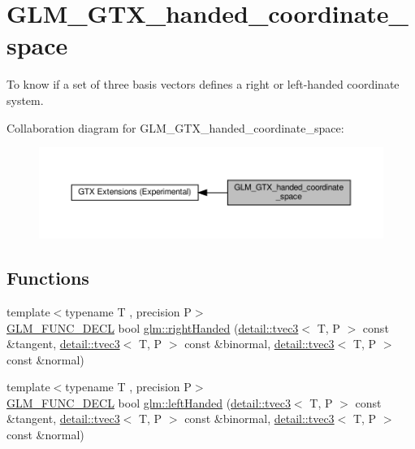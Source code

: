 \hypertarget{group__gtx__handed__coordinate__space}{}\section{G\+L\+M\+\_\+\+G\+T\+X\+\_\+handed\+\_\+coordinate\+\_\+space}
\label{group__gtx__handed__coordinate__space}


To know if a set of three basis vectors defines a right or left-\/handed coordinate system.  


Collaboration diagram for G\+L\+M\+\_\+\+G\+T\+X\+\_\+handed\+\_\+coordinate\+\_\+space\+:\nopagebreak
\begin{figure}[H]
\begin{center}
\leavevmode
\includegraphics[width=350pt]{group__gtx__handed__coordinate__space}
\end{center}
\end{figure}
\subsection*{Functions}
\begin{DoxyCompactItemize}
\item 
{\footnotesize template$<$typename T , precision P$>$ }\\\hyperlink{setup_8hpp_ab2d052de21a70539923e9bcbf6e83a51}{G\+L\+M\+\_\+\+F\+U\+N\+C\+\_\+\+D\+E\+CL} bool \hyperlink{group__gtx__handed__coordinate__space_ga16517e8a56cba5ba908e6eac6500ab94}{glm\+::right\+Handed} (\hyperlink{structglm_1_1detail_1_1tvec3}{detail\+::tvec3}$<$ T, P $>$ const \&tangent, \hyperlink{structglm_1_1detail_1_1tvec3}{detail\+::tvec3}$<$ T, P $>$ const \&binormal, \hyperlink{structglm_1_1detail_1_1tvec3}{detail\+::tvec3}$<$ T, P $>$ const \&normal)
\item 
{\footnotesize template$<$typename T , precision P$>$ }\\\hyperlink{setup_8hpp_ab2d052de21a70539923e9bcbf6e83a51}{G\+L\+M\+\_\+\+F\+U\+N\+C\+\_\+\+D\+E\+CL} bool \hyperlink{group__gtx__handed__coordinate__space_ga2c0882af0eabd0e39da5680931f586ed}{glm\+::left\+Handed} (\hyperlink{structglm_1_1detail_1_1tvec3}{detail\+::tvec3}$<$ T, P $>$ const \&tangent, \hyperlink{structglm_1_1detail_1_1tvec3}{detail\+::tvec3}$<$ T, P $>$ const \&binormal, \hyperlink{structglm_1_1detail_1_1tvec3}{detail\+::tvec3}$<$ T, P $>$ const \&normal)
\end{DoxyCompactItemize}


